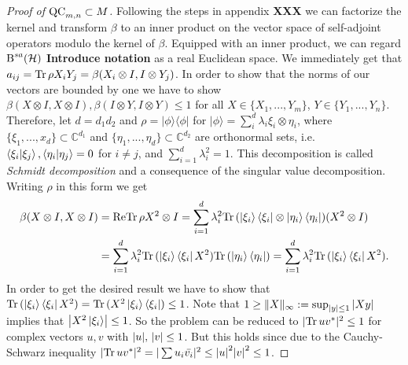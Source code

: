 \begin{proof}[Proof of $ \textup{QC}_{m,n} \subset M $]
	Following the steps in appendix \textbf{XXX} we can factorize the kernel and transform $ \beta $ to an inner product on the vector space of self-adjoint operators modulo the kernel of $ \beta $. 
	Equipped with an inner product, we can regard $ \textup{B}^{sa}(\mathcal{H}) $ \textbf{Introduce notation} as a real Euclidean space. 
	We immediately get that $ a_{ij} =\text{Tr} \, {\rho X_i Y_j} =  \beta(X_i \otimes I,I \otimes Y_j) $. In order to show that the norms of our vectors are bounded by one we have to show
	$ \beta(X \otimes I, X \otimes I), \beta(I \otimes Y, I \otimes Y) \le 1$ for all $ X \in \{X_1,...,Y_m \} $, $ Y \in \{Y_1,...,Y_n \} $. 
	Therefore, let $ d = d_1d_2 $ and $ \rho = \vert \phi \rangle \langle \phi \vert $ for $ \vert \phi \rangle = \sum_{i}^{d}\lambda_i \xi_i \otimes \eta_i $, where $ \{ \xi_1,...,x_d \} \subset \mathbb{C}^{d_1}$ and $ \{  \eta_1,...,\eta_d\} \subset \mathbb{C}^{d_2}$ are orthonormal sets, i.e. $ \braket{\xi_i \vert \xi_j}, \braket{\eta_i \vert \eta_j} = 0 $ for $ i \neq j $, and $ \sum_{i=1}^d \lambda_i^2 = 1 $. This decomposition is called {\itshape Schmidt decomposition} and a consequence of the singular value decomposition. Writing $ \rho $ in this form we get 
	\begin{align*}
		\beta(X \otimes I, X \otimes I) &= \textup{Re} \text{Tr} \, {\rho X^2 \otimes I} =  \sum_{i=1}^d \lambda_i^2 \text{Tr} \, {(\ket{\xi_i} \bra{\xi_i} \otimes \ket{\eta_i}\bra{\eta_i})(X^2 \otimes I) }  \\
		&= \sum_{i=1}^{d}\lambda_i^2 \text{Tr} \, {(\ket{\xi_i} \bra{\xi_i}X^2)} \text{Tr} \, {(\ket{\eta_i}\bra{\eta_i})}  =  \sum_{i=1}^{d}\lambda_i^2 \text{Tr} \, {(\ket{\xi_i} \bra{\xi_i}X^2)} .
	\end{align*}
	In order to get the desired result we have to show that $ \text{Tr} \, {(\ket{\xi_i} \bra{\xi_i}X^2)}  = \text{Tr} \, {(X^2\ket{\xi_i} \bra{\xi_i})}  \le 1 $. 
	Note that $1 \ge  \Vert {X} \Vert_{\infty} := \sup_{{\left|{y}\right|}\le 1} {\left|{Xy}\right|} $ implies that $ {\left|{X^2\ket{\xi_i}}\right|} \le 1 $. So the problem can be reduced to $ \vert \text{Tr} \, {uv^*} \vert^2 \le 1 $ for complex vectors $ u,v $ with $ {\left|{u}\right|},\, {\left|{v}\right|} \le 1 $. But this holds since due to the Cauchy-Schwarz inequality 
	$ \vert\text{Tr} \, {uv^*} \vert^2 = \vert\sum u_i \bar{v_i}\vert^2 \le {\left|{u}\right|}^2{\left|{v}\right|}^2 \le 1 $.
	

\end{proof}
